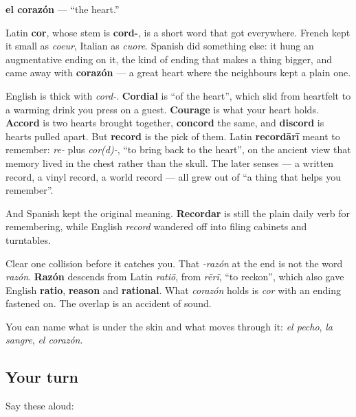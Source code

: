 \begin{cousinweb}
\textbf{el corazón} — \textquotedblleft{}the heart.\textquotedblright{}

Latin \textbf{cor}, whose stem is \textbf{cord-}, is a short word that got everywhere. French kept it small as \emph{coeur}, Italian as \emph{cuore}. Spanish did something else: it hung an augmentative ending on it, the kind of ending that makes a thing bigger, and came away with \textbf{corazón} — a great heart where the neighbours kept a plain one.

English is thick with \emph{cord-}. \textbf{Cordial} is \textquotedblleft{}of the heart\textquotedblright{}, which slid from heartfelt to a warming drink you press on a guest. \textbf{Courage} is what your heart holds. \textbf{Accord} is two hearts brought together, \textbf{concord} the same, and \textbf{discord} is hearts pulled apart. But \textbf{record} is the pick of them. Latin \textbf{recordārī} meant to remember: \emph{re-} plus \emph{cor(d)-}, \textquotedblleft{}to bring back to the heart\textquotedblright{}, on the ancient view that memory lived in the chest rather than the skull. The later senses — a written record, a vinyl record, a world record — all grew out of \textquotedblleft{}a thing that helps you remember\textquotedblright{}.

And Spanish kept the original meaning. \textbf{Recordar} is still the plain daily verb for remembering, while English \emph{record} wandered off into filing cabinets and turntables.

Clear one collision before it catches you. That \emph{-razón} at the end is not the word \emph{razón}. \textbf{Razón} descends from Latin \emph{ratiō}, from \emph{rērī}, \textquotedblleft{}to reckon\textquotedblright{}, which also gave English \textbf{ratio}, \textbf{reason} and \textbf{rational}. What \emph{corazón} holds is \emph{cor} with an ending fastened on. The overlap is an accident of sound.
\end{cousinweb}

\begin{grammarlens}[title={What you've built}]
You can name what is under the skin and what moves through it: \emph{el pecho}, \emph{la sangre}, \emph{el corazón}.
\end{grammarlens}

\subsection*{Your turn}
Say these aloud:

